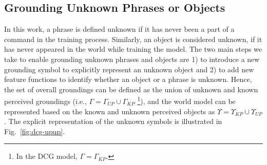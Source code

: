 \subsection{Grounding Unknown Phrases or Objects}




In this work, a phrase is defined unknown if it has never been a part of a command in the training process. Similarly, an object is considered unknown, if it has never appeared in the world while training the model. The two main steps we take to enable grounding unknown phrases and objects are 1) to introduce a new grounding symbol to explicitly represent an unknown object and 2) to add new feature functions to identify whether an object or a phrase is unknown. Hence, the set of overall groundings can be defined as the union of unknown and known perceived groundings (i.e., $\Gamma = \Gamma_{UP} \cup \Gamma_{KP}$ \footnote{In the DCG model, $\Gamma = \Gamma_{KP}$.}), and the world model can be represented based on the known and unknown perceived objects as $\Upsilon = \Upsilon_{KP} \cup \Upsilon_{UP}$. The explicit representation of the unknown symbols is illustrated in Fig.~\ref{fig:dcg-upup}.

